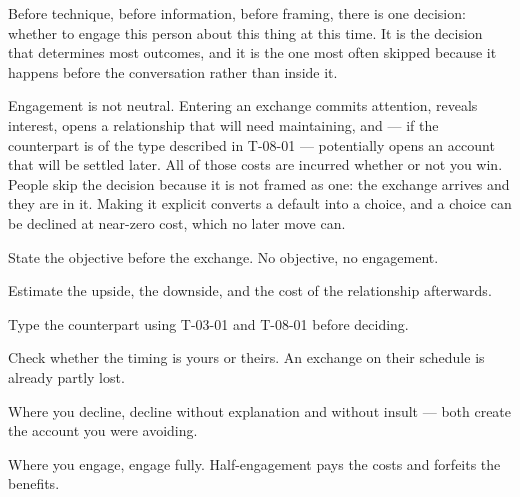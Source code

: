 


\begin{core}
Before technique, before information, before framing, there is one decision: whether to engage this person about this thing at this time. It is the decision that determines most outcomes, and it is the one most often skipped because it happens before the conversation rather than inside it.
\end{core}

\begin{mechanism}
Engagement is not neutral. Entering an exchange commits attention, reveals interest, opens a relationship that will need maintaining, and --- if the counterpart is of the type described in T-08-01 --- potentially opens an account that will be settled later. All of those costs are incurred whether or not you win. People skip the decision because it is not framed as one: the exchange arrives and they are in it. Making it explicit converts a default into a choice, and a choice can be declined at near-zero cost, which no later move can.
\end{mechanism}

\begin{application}
  \item State the objective before the exchange. No objective, no engagement.
  \item Estimate the upside, the downside, and the cost of the relationship afterwards.
  \item Type the counterpart using T-03-01 and T-08-01 before deciding.
  \item Check whether the timing is yours or theirs. An exchange on their schedule is already partly lost.
  \item Where you decline, decline without explanation and without insult --- both create the account you were avoiding.
  \item Where you engage, engage fully. Half-engagement pays the costs and forfeits the benefits.
\end{application}

